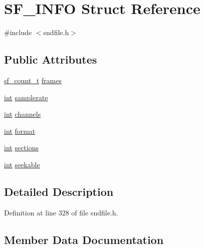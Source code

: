 \hypertarget{struct_s_f___i_n_f_o}{}\section{S\+F\+\_\+\+I\+N\+FO Struct Reference}
\label{struct_s_f___i_n_f_o}


{\ttfamily \#include $<$sndfile.\+h$>$}

\subsection*{Public Attributes}
\begin{DoxyCompactItemize}
\item 
\hyperlink{mac_2config_2i386_2lib-src_2libsndfile_2src_2sndfile_8h_a398121a5f562230ea7f772528fff5f84}{sf\+\_\+count\+\_\+t} \hyperlink{struct_s_f___i_n_f_o_a80838e7063ecc3d8d7ff9f92ab1efdfb}{frames}
\item 
\hyperlink{xmltok_8h_a5a0d4a5641ce434f1d23533f2b2e6653}{int} \hyperlink{struct_s_f___i_n_f_o_acfd248e20ab1c58b57aafc7b16404a5f}{samplerate}
\item 
\hyperlink{xmltok_8h_a5a0d4a5641ce434f1d23533f2b2e6653}{int} \hyperlink{struct_s_f___i_n_f_o_aad5220b31d2672bf83d3cf4cea0b2826}{channels}
\item 
\hyperlink{xmltok_8h_a5a0d4a5641ce434f1d23533f2b2e6653}{int} \hyperlink{struct_s_f___i_n_f_o_a36a7c3ae9a8229797f19267b4ba07361}{format}
\item 
\hyperlink{xmltok_8h_a5a0d4a5641ce434f1d23533f2b2e6653}{int} \hyperlink{struct_s_f___i_n_f_o_a5f4c7cb564c05f6c3eeac9164a806544}{sections}
\item 
\hyperlink{xmltok_8h_a5a0d4a5641ce434f1d23533f2b2e6653}{int} \hyperlink{struct_s_f___i_n_f_o_ad8978123d4122e137e9500f65d28ac31}{seekable}
\end{DoxyCompactItemize}


\subsection{Detailed Description}


Definition at line 328 of file sndfile.\+h.



\subsection{Member Data Documentation}
